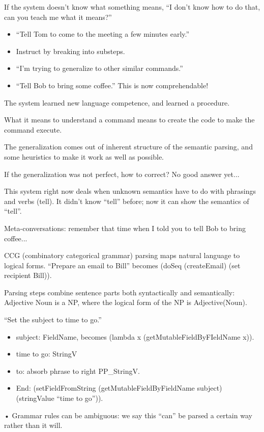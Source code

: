 If the system doesn't know what something means, ``I don't know how to do that, can you teach me what it means?''

\begin{itemize}
\item
``Tell Tom to come to the meeting a few minutes early.''
\item
Instruct by breaking into substeps.
\item
``I'm trying to generalize to other similar commands.''
\item
``Tell Bob to bring some coffee.'' This is now comprehendable!
\end{itemize}

The system learned new language competence, and learned a procedure. 

What it means to understand a command means to create the code to make the command execute.

The generalization comes out of inherent structure of the semantic parsing, and some heuristics to make it work as well as possible.

If the generalization was not perfect, how to correct? No good answer yet...

This system right now deals when unknown semantics have to do with phrasings and verbs (tell). It didn't know ``tell'' before; now it can show the semantics of ``tell''. 

Meta-conversations: remember that time when I told you to tell Bob to bring coffee...

CCG (combinatory categorical grammar) parsing maps natural language to logical forms.
``Prepare an email to Bill'' becomes (doSeq (createEmail) (set recipient Bill)). 

Parsing steps combine sentence parts both syntactically and semantically: Adjective Noun is a NP, where the logical form of the NP is Adjective(Noun).


``Set the subject to time to go.''

\begin{itemize}
\item
subject: FieldName, becomes (lambda x (getMutableFieldByFIeldName x)).
\item
time to go: StringV
\item
to: absorb phrase to right PP\_StringV.
\item
End: (setFieldFromString (getMutableFieldByFieldName subject) (stringValue ``time to go'')).
\end{itemize}•
Grammar rules can be ambiguous: we say this ``can'' be parsed a certain way rather than it will.


